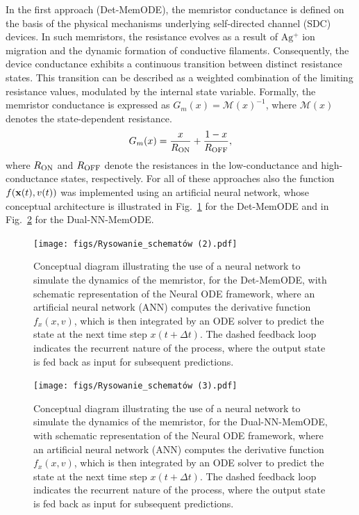 \documentclass[lettersize,journal]{IEEEtran}
\newcommand{\M}{\mathcal{M}}
\newcommand{\Ron}{R_{\rm ON}}
\newcommand{\Roff}{R_{\rm OFF}}
\newcommand{\ua}{v}
\begin{document}
In the first approach (Det-MemODE), the memristor conductance is defined on the basis of the physical mechanisms underlying self-directed channel (SDC) devices. In such memristors, the resistance evolves as a result of \(\mathrm{Ag^+}\) ion migration and the dynamic formation of conductive filaments. Consequently, the device conductance exhibits a continuous transition between distinct resistance states. This transition can be described as a weighted combination of the limiting resistance values, modulated by the internal state variable. Formally, the memristor conductance is expressed as \(G_m(x) = \M(x)^{-1}\), where \(\M(x)\) denotes the state-dependent resistance.
\begin{equation}
  G_{m}(x) = \frac{x}{R_{\rm ON}} + \frac{1 - x}{R_{\rm OFF}},
  \label{eq:conductance}
\end{equation}
where \(\Ron\) and \(\Roff\) denote the resistances in the low-conductance and high-conductance states, respectively. For all of these approaches also the function \(f(\xvec(t), \ua(t))\) was implemented using an artificial neural network, whose conceptual architecture is illustrated in Fig.~\ref{fig:nn_structure} for the Det-MemODE and in Fig.~\ref{fig:nn_structure_dual} for the Dual-NN-MemODE.

\begin{figure}[t!]
  \centering
  \texttt{[image: figs/Rysowanie\_schematów (2).pdf]}
  \caption{ Conceptual diagram illustrating the use of a neural network to simulate the dynamics of the memristor, for the Det-MemODE, with schematic representation of the Neural ODE framework, where an artificial neural network (ANN) computes the derivative function \(f_x(x,v)\), which is then integrated by an ODE solver to predict the state at the next time step \(x(t + \Delta t)\). The dashed feedback loop indicates the recurrent nature of the process, where the output state is fed back as input for subsequent predictions.}
  \label{fig:nn_structure}
\end{figure}

\begin{figure}[t!]
  \centering
  \texttt{[image: figs/Rysowanie\_schematów (3).pdf]}
  \caption{ Conceptual diagram illustrating the use of a neural network to simulate the dynamics of the memristor, for the Dual-NN-MemODE, with schematic representation of the Neural ODE framework, where an artificial neural network (ANN) computes the derivative function \(f_x(x,v)\), which is then integrated by an ODE solver to predict the state at the next time step \(x(t + \Delta t)\). The dashed feedback loop indicates the recurrent nature of the process, where the output state is fed back as input for subsequent predictions.}
  \label{fig:nn_structure_dual}
\end{figure}
\end{document}
